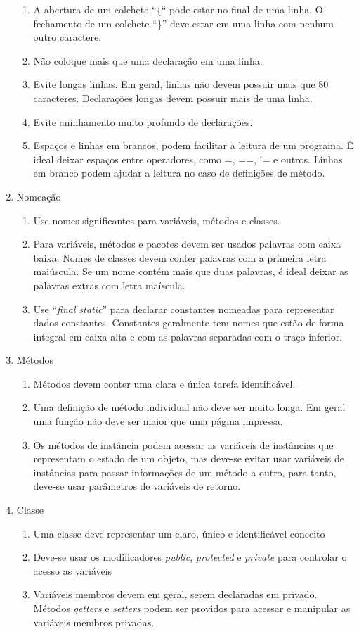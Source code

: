 \documentclass[conference]{IEEEtran}
\begin{document}
\begin{enumerate}
\begin{enumerate}
\item A abertura de um colchete “\{“ pode estar no final de uma linha. O fechamento de um colchete “\}” deve estar em uma linha com nenhum outro caractere.
\item Não coloque mais que uma declaração em uma linha.
\item Evite longas linhas. Em geral, linhas não devem possuir mais que 80 caracteres. Declarações longas devem possuir mais de uma linha.
\item Evite aninhamento muito profundo de declarações.
\item Espaços e linhas em brancos, podem facilitar a leitura de um programa. É ideal deixar espaços entre operadores, como =, ==, != e outros. Linhas em branco podem ajudar a leitura no caso de definições de método.
\end{enumerate}
\item Nomeação
\begin{enumerate}
\item Use nomes significantes para variáveis, métodos e classes.
\item Para variáveis, métodos e pacotes devem ser usados palavras com caixa baixa. Nomes de classes devem conter palavras com a primeira letra maiúscula. Se um nome contém mais que duas palavras, é ideal deixar as palavras extras com letra maíscula.
\item Use “\textit{final static}” para declarar constantes nomeadas para representar dados constantes. Constantes geralmente tem nomes que estão de forma integral em caixa alta e com as palavras separadas com o traço inferior.
\end{enumerate}
\item Métodos
\begin{enumerate}
\item Métodos devem conter uma clara e única tarefa identificável.
\item Uma definição de método individual não deve ser muito longa. Em geral uma função não deve ser maior que uma página impressa.
\item Os métodos de instância podem acessar as variáveis de instâncias que representam o estado de um objeto, mas deve-se evitar usar variáveis de instâncias para passar informações de um método a outro, para tanto, deve-se usar parâmetros de variáveis de retorno.
\end{enumerate}
\item Classe
\begin{enumerate}
\item Uma classe deve representar um claro, único e identificável conceito
\item Deve-se usar os modificadores \textit{public}, \textit{protected} e \textit{private} para controlar o acesso as variáveis
\item Variáveis membros devem em geral, serem declaradas em privado. Métodos \textit{getters} e \textit{setters} podem ser providos para acessar e manipular as variáveis membros privadas.
\end{enumerate}
\end{enumerate}
\end{document}
